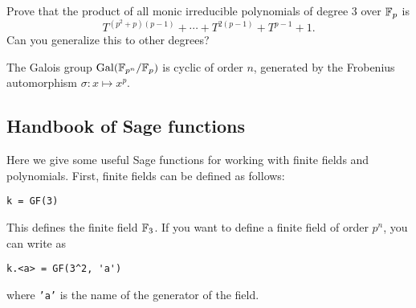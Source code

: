 \begin{exercise}
    Prove that the product of all monic irreducible polynomials of degree $3$ over $\mathbb{F}_p$ is
    \[
        T^{(p^2 + p)(p - 1)} + \cdots + T^{2(p-1)} + T^{p-1} + 1.
    \]
    Can you generalize this to other degrees?
\end{exercise}

\begin{theorem}
    The Galois group $\mathrm{Gal}(\mathbb{F}_{p^n} / \mathbb{F}_p)$ is cyclic of order $n$, generated by the Frobenius automorphism $\sigma: x \mapsto x^p$.
\end{theorem}



\newpage

\subsection{Handbook of Sage functions}
\label{subsec:handbook_sage}

Here we give some useful Sage functions for working with finite fields and polynomials.
First, finite fields can be defined as follows:
\begin{verbatim}
k = GF(3)
\end{verbatim}
This defines the finite field $\mathbb{F}_3$.
If you want to define a finite field of order $p^n$, you can write as
\begin{verbatim}
k.<a> = GF(3^2, 'a')
\end{verbatim}
where \texttt{'a'} is the name of the generator of the field.

